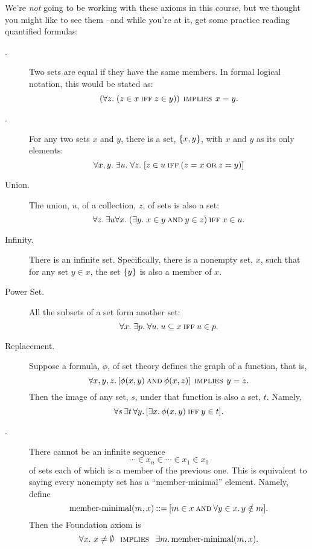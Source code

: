 We're \emph{not} going to be working with these axioms in this course,
but we thought you might like to see them --and while you're at it, get
some practice reading quantified formulas:

\begin{description}

\item[.] Two sets are equal if they have the same members.
In formal logical notation, this would be stated as:
\[
(\forall z.\; (z \in x \mathbin{\mathrm{\textsc{iff}}} z \in y)) \mathbin{\mathrm{\textsc{\,implies\,}}} x = y.
\]

\item[.] For any two sets $x$ and $y$, there is a set,
     $\left\{x,y\right\}$, with $x$ and $y$ as its only elements:
\[
\forall x,y.\; \exists u.\; \forall z.\;
[z \in u \mathbin{\mathrm{\textsc{iff}}} (z = x \mathbin{\mathrm{\textsc{or}}} z = y)]
\]

\item[Union.] The union, $u$, of a collection, $z$, of sets is also a set:
\[
\forall z.\, \exists u \forall x.\; (\exists y.\; x \in y \mathbin{\mathrm{\textsc{and}}} y \in z) \mathbin{\mathrm{\textsc{iff}}} x \in u.
\]

\item[Infinity.]  There is an infinite set.
  Specifically, there is a nonempty set, $x$, such that for any set $y \in
  x$, the set $\left\{y\right\}$ is also a member of $x$.


\item[Power Set.]  All the subsets of a set form another set:
\[
\forall x.\; \exists p.\; \forall u.\: u \subseteq x \mathbin{\mathrm{\textsc{iff}}} u \in p.
\]

\item[Replacement.]  Suppose a formula, $\phi$,
  of set theory defines the graph of a function, that is,
\[
\forall x, y, z.\, [\phi(x,y) \mathbin{\mathrm{\textsc{and}}} \phi(x,z)] \mathbin{\mathrm{\textsc{\,implies\,}}} y = z.
\]
Then the image of any set, $s$, under that function is also a set, $t$.  Namely,
\[
\forall s\, \exists t\, \forall y.\, [\exists x.\, \phi(x,y) \mathbin{\mathrm{\textsc{iff}}} y \in t].
\]


\item[.] 
There cannot be an infinite sequence
\[
\cdots \in x_n \in \cdots \in x_1 \in x_0
\]
of sets each of which is a member of the previous one.  This is equivalent
to saying every nonempty set has a ``member-minimal'' element.  Namely, define
\[
\text{member-minimal}(m, x) \mathbin{::=} [m \in x \mathbin{\mathrm{\textsc{and}}} \forall y \in x.\, y \notin m].
\]
Then the Foundation axiom is
\[
\forall x.\ x \neq \emptyset\ \mathbin{\mathrm{\textsc{\,implies\,}}}\ \exists m.\, \text{member-minimal}(m, x).
\]


\end{description}
